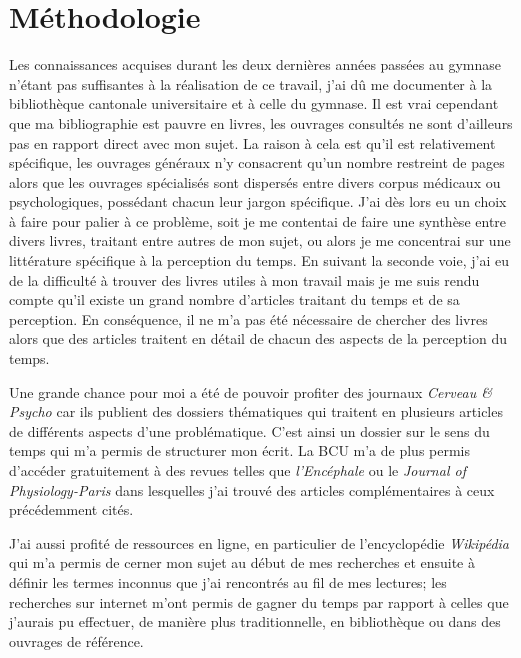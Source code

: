 \documentclass[12pt,fleqn,oneside,french,openany]{book} %
\begin{document}
\section{Méthodologie} \label{sec:methodologie}
Les connaissances acquises durant les deux dernières années passées au gymnase n'étant pas suffisantes à la réalisation de ce travail, j'ai dû me documenter à la bibliothèque cantonale universitaire et à celle du gymnase. Il est vrai cependant que ma bibliographie est pauvre en livres, les ouvrages consultés ne sont d'ailleurs pas en rapport direct avec mon sujet. La raison à cela est qu'il est relativement spécifique, les ouvrages généraux n'y consacrent qu'un nombre restreint de pages alors que les ouvrages spécialisés sont dispersés entre divers corpus médicaux ou psychologiques, possédant chacun leur jargon spécifique. J'ai dès lors eu un choix à faire pour palier à ce problème, soit je me contentai de faire une synthèse entre divers livres, traitant entre autres de mon sujet, ou alors je me concentrai sur une littérature spécifique à la perception du temps. En suivant la seconde voie, j'ai eu de la difficulté à trouver des livres utiles à mon travail mais je me suis rendu compte qu'il existe un grand nombre d'articles traitant du temps et de sa perception. En conséquence, il ne m'a pas été nécessaire de chercher des livres alors que des articles traitent en détail de chacun des aspects de la perception du temps.

Une grande chance pour moi a été de pouvoir profiter des journaux \emph{Cerveau \& Psycho} car ils publient des dossiers thématiques qui traitent en plusieurs articles de différents aspects d'une problématique. C'est ainsi un dossier sur le sens du temps qui m'a permis de structurer mon écrit. 
La BCU m'a de plus permis d'accéder gratuitement à des revues telles que \emph{l'Encéphale} ou le \emph{Journal of Physiology-Paris} dans lesquelles j'ai trouvé des articles complémentaires à ceux précédemment cités. 

J'ai aussi profité de ressources en ligne, en particulier de l'encyclopédie \textit{Wikipédia} qui m'a permis de cerner mon sujet au début de mes recherches et ensuite à définir les termes inconnus que j'ai rencontrés au fil de mes lectures; les recherches sur internet m'ont permis de gagner du temps par rapport à celles que j'aurais pu effectuer, de manière plus traditionnelle, en bibliothèque ou dans des ouvrages de référence.
\end{document}
